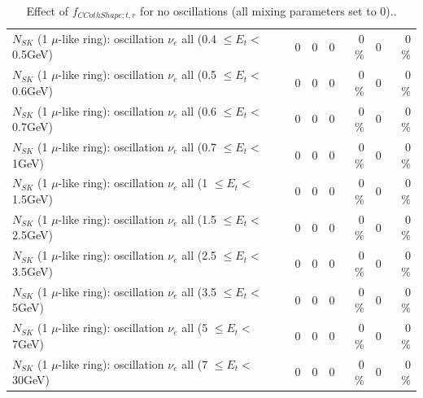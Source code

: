 \begin{table}
\begin{tabular}{| l | r | r | r  r | r  r |}
$N_{SK}$ (1 $\mu$-like ring): oscillation $\nu_{e}$ all (0.4 $\leq E_{t} <$ 0.5GeV) &               0 &               0 &               0 &        0 \%  &               0 &        0 \%  \\ 
$N_{SK}$ (1 $\mu$-like ring): oscillation $\nu_{e}$ all (0.5 $\leq E_{t} <$ 0.6GeV) &               0 &               0 &               0 &        0 \%  &               0 &        0 \%  \\ 
$N_{SK}$ (1 $\mu$-like ring): oscillation $\nu_{e}$ all (0.6 $\leq E_{t} <$ 0.7GeV) &               0 &               0 &               0 &        0 \%  &               0 &        0 \%  \\ 
$N_{SK}$ (1 $\mu$-like ring): oscillation $\nu_{e}$ all (0.7 $\leq E_{t} <$ 1GeV) &               0 &               0 &               0 &        0 \%  &               0 &        0 \%  \\ 
$N_{SK}$ (1 $\mu$-like ring): oscillation $\nu_{e}$ all (1 $\leq E_{t} <$ 1.5GeV) &               0 &               0 &               0 &        0 \%  &               0 &        0 \%  \\ 
$N_{SK}$ (1 $\mu$-like ring): oscillation $\nu_{e}$ all (1.5 $\leq E_{t} <$ 2.5GeV) &               0 &               0 &               0 &        0 \%  &               0 &        0 \%  \\ 
$N_{SK}$ (1 $\mu$-like ring): oscillation $\nu_{e}$ all (2.5 $\leq E_{t} <$ 3.5GeV) &               0 &               0 &               0 &        0 \%  &               0 &        0 \%  \\ 
$N_{SK}$ (1 $\mu$-like ring): oscillation $\nu_{e}$ all (3.5 $\leq E_{t} <$ 5GeV) &               0 &               0 &               0 &        0 \%  &               0 &        0 \%  \\ 
 $N_{SK}$ (1 $\mu$-like ring): oscillation $\nu_{e}$ all (5 $\leq E_{t} <$ 7GeV) &               0 &               0 &               0 &        0 \%  &               0 &        0 \%  \\ 
$N_{SK}$ (1 $\mu$-like ring): oscillation $\nu_{e}$ all (7 $\leq E_{t} <$ 30GeV) &               0 &               0 &               0 &        0 \%  &               0 &        0 \%  \\ 
\hline
\hline
\end{tabular}
\caption{ Effect of $f_{CCothShape; t, r}$ for no oscillations (all mixing parameters set to 0).. }
\label{tab:num_xsec_shape_ccoth_1RmuT_3f_osc_t13:0}
\end{table}
\clearpage
